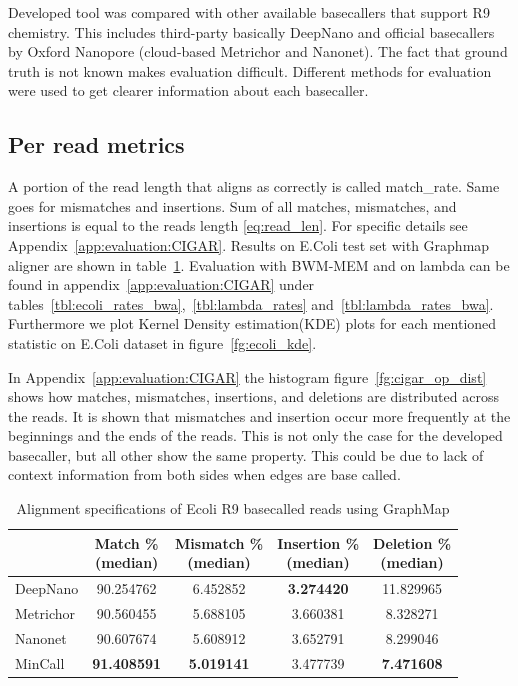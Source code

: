 \documentclass[runningheads,a4paper]{llncs}
\begin{document}
Developed tool was compared with other available basecallers that support R9 chemistry. This includes third-party basically DeepNano and official basecallers by Oxford Nanopore (cloud-based Metrichor and Nanonet).
The fact that ground truth is not known makes evaluation difficult.
Different methods for evaluation were used to get clearer information about each basecaller.

\subsection{Per read metrics}
\label{subs:read_metrics}
A portion of the read length that aligns as correctly is called match\_rate. Same goes for mismatches and insertions.
Sum of all matches, mismatches, and insertions is equal to the reads length \ref{eq:read_len}. For specific details see Appendix~\ref{app:evaluation:CIGAR}. Results on E.Coli test set with Graphmap aligner are shown in table~\ref{tbl:ecoli_rates}. Evaluation with BWM-MEM and on lambda can be found in appendix~\ref{app:evaluation:CIGAR} under tables~\ref{tbl:ecoli_rates_bwa},~\ref{tbl:lambda_rates} and~\ref{tbl:lambda_rates_bwa}. Furthermore we plot Kernel Density estimation(KDE) plots for each mentioned statistic on E.Coli dataset in figure~\ref{fg:ecoli_kde}.

In Appendix~\ref{app:evaluation:CIGAR} the histogram figure~\ref{fg:cigar_op_dist} shows how matches, mismatches, insertions, and deletions are distributed across the reads. It is shown that mismatches and insertion occur more frequently at the beginnings and the ends of the reads. This is not only the case for the developed basecaller, but all other show the same property. This could be due to lack of context information from both sides when edges are base called.

\begin{table}[]
	\caption{Alignment specifications of Ecoli R9 basecalled reads using GraphMap}
	\label{tbl:ecoli_rates}
	\centering
	\begin{tabular}{lcccc}
		\toprule
		{} &  \thead{Match \% \\(median)} &  \thead{Mismatch \% \\(median)} &  \thead{Insertion \% \\(median)} &  \thead{Deletion \% \\(median)} \\
		\midrule
		DeepNano   &                  90.254762 &                      6.452852 &                       \textbf{3.274420} &                     11.829965 \\
		Metrichor  &                  90.560455 &                      5.688105 &                       3.660381 &                      8.328271 \\
		Nanonet    &                  90.607674 &                      5.608912 &                       3.652791 &                      8.299046 \\
		MinCall    &                  \textbf{91.408591} &                     \textbf{ 5.019141} &                       3.477739 &                      \textbf{7.471608 }\\
		\bottomrule
	\end{tabular}
\end{table}
\end{document}
